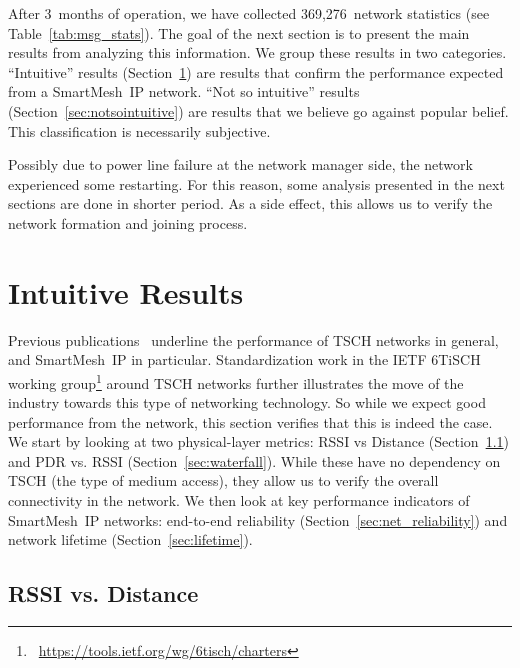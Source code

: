 \documentclass{elsarticle}
\newcommand{\smip}                {SmartMesh~IP\xspace}
\newcommand{\PEACHNUMSTATS}       {369,276\xspace}
\begin{document}

After 3~months of operation, we have collected \PEACHNUMSTATS~network statistics (see Table~\ref{tab:msg_stats}).
The goal of the next section is to present the main results from analyzing this information.
We group these results in two categories.
``Intuitive'' results (Section~\ref{sec:intuitive}) are results that confirm the performance expected from a \smip network.
``Not so intuitive'' results (Section~\ref{sec:notsointuitive}) are results that we believe go against popular belief.
This classification is necessarily subjective.

Possibly due to power line failure at the network manager side, the network experienced some restarting.
For this reason, some analysis presented in the next sections are done in shorter period.
As a side effect, this allows us to verify the network formation and joining process.

\section{Intuitive Results}
\label{sec:intuitive}

Previous publications~\cite{watteyne16peach,watteyne10mitigating,watteyne09reliability,watteyne15industrial} underline the performance of TSCH networks in general, and \smip in particular.
Standardization work in the IETF 6TiSCH working group\footnote{~\url{https://tools.ietf.org/wg/6tisch/charters}} around TSCH networks further illustrates the move of the industry towards this type of networking technology.
So while we expect good performance from the network, this section verifies that this is indeed the case.
We start by looking at two physical-layer metrics: RSSI vs Distance (Section~\ref{sec:rssi_distance}) and PDR vs. RSSI (Section~\ref{sec:waterfall}).
While these have no dependency on TSCH (the type of medium access), they allow us to verify the overall connectivity in the network.
We then look at key performance indicators of \smip networks: end-to-end reliability (Section~\ref{sec:net_reliability}) and network lifetime (Section~\ref{sec:lifetime}).

\subsection{RSSI vs. Distance}
\label{sec:rssi_distance}
\end{document}
